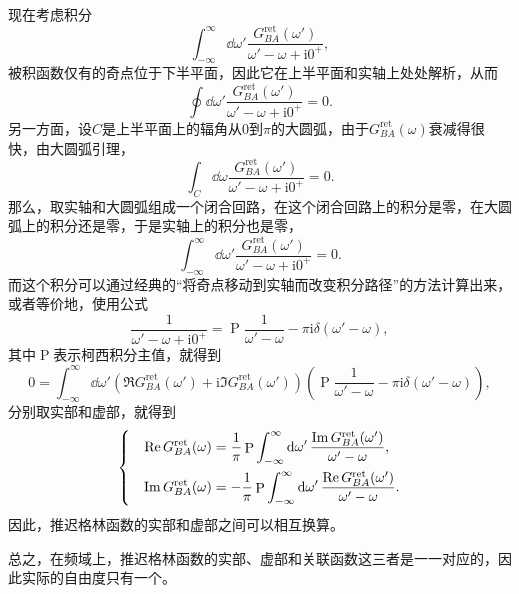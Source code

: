 \documentclass[hyperref, UTF8, a4paper]{ctexart}
\DeclareMathOperator{\primevalue}{P}
\newcommand*{\ii}{\mathrm{i}}
\newenvironment{bigcase}{\left\{\quad\begin{aligned}}{\end{aligned}\right.}
\begin{document}
现在考虑积分
\[
    \int_{-\infty}^\infty \dd{\omega'} \frac{G_{BA}^\text{ret}(\omega')}{\omega' - \omega + \ii 0^+},
\]
被积函数仅有的奇点位于下半平面，因此它在上半平面和实轴上处处解析，从而
\[
    \oint \dd{\omega'} \frac{G_{BA}^\text{ret}(\omega')}{\omega' - \omega + \ii 0^+} = 0.
\]
另一方面，设$C$是上半平面上的辐角从$0$到$\pi$的大圆弧，由于$G_{BA}^\text{ret}(\omega)$衰减得很快，由大圆弧引理，
\[
    \int_C \dd{\omega} \frac{G_{BA}^\text{ret}(\omega')}{\omega' - \omega + \ii 0^+} = 0.
\]
那么，取实轴和大圆弧组成一个闭合回路，在这个闭合回路上的积分是零，在大圆弧上的积分还是零，于是实轴上的积分也是零，
\[
    \int_{-\infty}^\infty \dd{\omega'} \frac{G_{BA}^\text{ret}(\omega')}{\omega' - \omega + \ii 0^+} = 0.
\]
而这个积分可以通过经典的“将奇点移动到实轴而改变积分路径”的方法计算出来，或者等价地，使用公式
\[
    \frac{1}{\omega'-\omega+\ii 0^+} = \primevalue \frac{1}{\omega'-\omega} - \pi \ii \delta(\omega'-\omega),
\]
其中$\primevalue$表示柯西积分主值，就得到
\[
    0 = \int_{-\infty}^\infty \dd{\omega'} \left( \Re G_{BA}^\text{ret}(\omega') + \ii \Im G_{BA}^\text{ret}(\omega') \right) \left( \primevalue \frac{1}{\omega'-\omega} - \pi \ii \delta(\omega'-\omega) \right),
\]
分别取实部和虚部，就得到
\begin{equation}
    \begin{bigcase}
        \Re G_{BA}^\text{ret}(\omega) &= \frac{1}{\pi} \primevalue \int_{-\infty}^\infty \dd{\omega'} \frac{\Im G_{BA}^\text{ret}(\omega')}{\omega' - \omega}, \\
        \Im G_{BA}^\text{ret}(\omega) &= - \frac{1}{\pi} \primevalue \int_{-\infty}^\infty \dd{\omega'} \frac{\Re G_{BA}^\text{ret}(\omega')}{\omega' - \omega}.
    \end{bigcase}
\end{equation}
因此，推迟格林函数的实部和虚部之间可以相互换算。

总之，在频域上，推迟格林函数的实部、虚部和关联函数这三者是一一对应的，因此实际的自由度只有一个。
\end{document}
